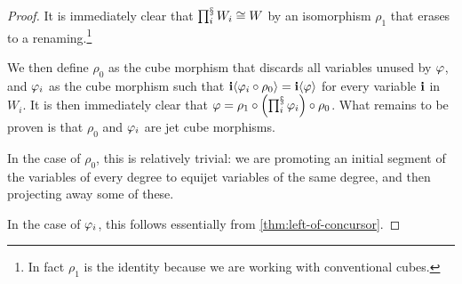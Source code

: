 \documentclass[a4paper]{memoir}
\begin{document}
\begin{proof}

	It is immediately clear that $\prod^{\mathbin{\mathsection}}_i W_i \cong W$ by an isomorphism $\rho_1$ that erases to a renaming.\footnote{In fact $\rho_1$ is the identity because we are working with conventional cubes.}
	
	We then define $\rho_0$ as the cube morphism that discards all variables unused by $\varphi$, and $\varphi_i$ as the cube morphism such that $\mathbf{i} \langle \varphi_i \circ \rho_0 \rangle = \mathbf{i} \langle \varphi \rangle$ for every variable $\mathbf{i}$ in $W_i$.
	It is then immediately clear that $\varphi = \rho_1 \circ \mathopen{}\left( \prod^{\mathbin{\mathsection}}_i \varphi_i \right)\mathclose{} \circ \rho_0$.
	What remains to be proven is that $\rho_0$ and $\varphi_i$ are jet cube morphisms.
	
	In the case of $\rho_0$, this is relatively trivial: we are promoting an initial segment of the variables of every degree to equijet variables of the same degree, and then projecting away some of these.
	
	In the case of $\varphi_i$, this follows essentially from \cref{thm:left-of-concursor}.
%	
%	
\end{proof}
\end{document}
